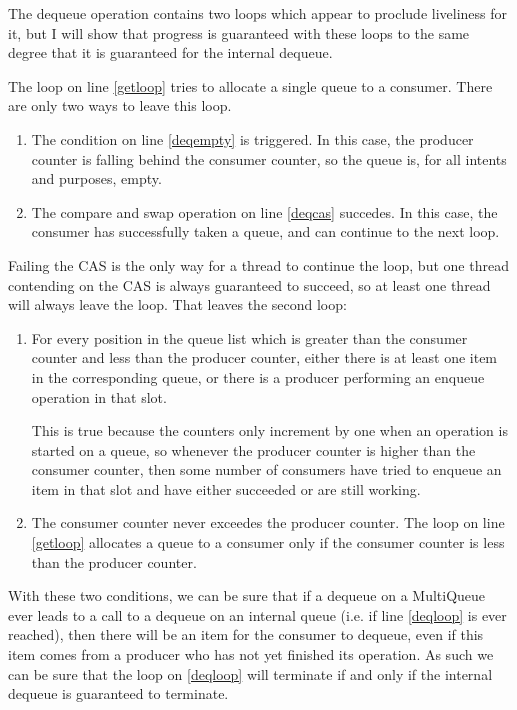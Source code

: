\documentclass[12pt]{report}
\begin{document}
The dequeue operation contains two loops which appear to proclude liveliness
for it, but I will show that progress is guaranteed with these loops to the
same degree that it is guaranteed for the internal dequeue.

The loop on line \ref{getloop} tries to allocate a single queue to a consumer.
There are only two ways to leave this loop.

\begin{enumerate}
\item The condition on line \ref{deqempty} is triggered. In this case, the
producer counter is falling behind the consumer counter, so the queue is, for
all intents and purposes, empty.

\item The compare and swap operation on line \ref{deqcas} succedes. In this
case, the consumer has successfully taken a queue, and can continue to the next
loop.
\end{enumerate}

Failing the CAS is the only way for a thread to continue the loop, but one
thread contending on the CAS is always guaranteed to succeed, so at least one
thread will always leave the loop. That leaves the second loop:

\begin{enumerate}
\item For every position in the queue list which is greater than the consumer
counter and less than the producer counter, either there is at least one item
in the corresponding queue, or there is a producer performing an enqueue
operation in that slot.

This is true because the counters only increment by one when an operation is
started on a queue, so whenever the producer counter is higher than the
consumer counter, then some number of consumers have tried to enqueue an item
in that slot and have either succeeded or are still working.

\item The consumer counter never exceedes the producer counter. The loop on
line \ref{getloop} allocates a queue to a consumer only if the consumer counter
is less than the producer counter.
\end{enumerate}

With these two conditions, we can be sure that if a dequeue on a MultiQueue
ever leads to a call to a dequeue on an internal queue (i.e. if line
\ref{deqloop} is ever reached), then there will be an item for the consumer to
dequeue, even if this item comes from a producer who has not yet finished its
operation. As such we can be sure that the loop on \ref{deqloop} will terminate
if and only if the internal dequeue is guaranteed to terminate.
\end{document}
